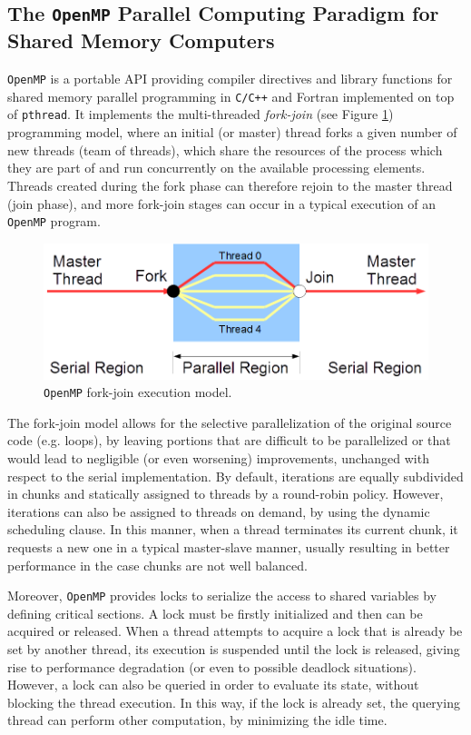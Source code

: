 \subsection{The \texttt{OpenMP} Parallel Computing Paradigm for Shared Memory Computers}
    \texttt{OpenMP} is a portable API providing compiler directives and library
    functions for shared memory parallel programming in \texttt{C/C++} and
    Fortran \cite{Chapman:2007:UOP:1370966} implemented on top of \texttt{pthread}. It implements the
    multi-threaded \emph{fork-join} (see Figure \ref{fig:omp_fork-join}) programming model, where an initial (or master) thread forks a given number of new threads (team of threads), which share the resources of the process which they are part of and run concurrently on the available processing
    elements. Threads created during the fork phase can therefore
    rejoin to the master thread (join phase), and more fork-join
    stages can occur in a typical execution of an \texttt{OpenMP} program.
\begin{figure}
	\centering
	\includegraphics[scale=0.8]{./images/parallel_programming/omp_fork-join}
	\caption{\texttt{OpenMP} fork-join execution model.}
	\label{fig:omp_fork-join}
\end{figure}


    The fork-join model allows for the selective parallelization of
    the original source code (e.g. loops), by leaving portions that
    are difficult to be parallelized or that would lead to negligible
    (or even worsening) improvements, unchanged with respect to the
    serial implementation. By default, iterations are equally
    subdivided in chunks and statically assigned to threads by a
    round-robin policy. However, iterations can also be assigned to
    threads on demand, by using the dynamic scheduling clause. In this
    manner, when a thread terminates its current chunk, it requests a
    new one in a typical master-slave manner, usually resulting in
    better performance in the case chunks are not well balanced.

    Moreover, \texttt{OpenMP} provides locks to serialize the access to shared
    variables by defining critical sections. A lock must be firstly
    initialized and then can be acquired or released. When a thread
    attempts to acquire a lock that is already be set by another
    thread, its execution is suspended until the lock is released,
    giving rise to performance degradation (or even to possible deadlock
    situations). However, a lock can also be queried in order to
    evaluate its state, without blocking the thread execution. In this
    way, if the lock is already set, the querying thread can perform
    other computation, by minimizing the idle time.

